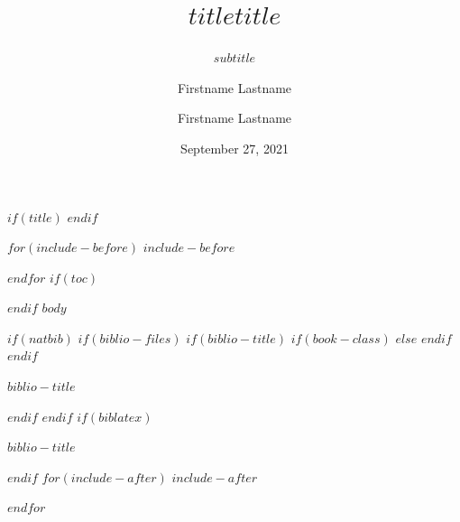 \documentclass[$if(fontsize)$$fontsize$,$endif$$if(handout)$handout,$endif$$if(beamer)$ignorenonframetext,$endif$$for(classoption)$$classoption$$sep$,$endfor$]{$documentclass$}
\title[$shorttitle$]{$title$}
\title{$title$}
\subtitle{$subtitle$}
\institute[$shortinstitute$]{$institute$}
\institute{$institute$}
\author[Firstname Lastname]{Firstname Lastname}
\author{Firstname Lastname}
\date{September 27, 2021}
\begin{document}
$if(title)$
\frame{\titlepage}
$endif$

$for(include-before)$
$include-before$

$endfor$
$if(toc)$
\begin{frame}
\tableofcontents[hideallsubsections]
\end{frame}

$endif$
$body$

$if(natbib)$
$if(biblio-files)$
$if(biblio-title)$
$if(book-class)$
\renewcommand\bibname{$biblio-title$}
$else$
\renewcommand\refname{$biblio-title$}
$endif$
$endif$
\begin{frame}[allowframebreaks]{$biblio-title$}

\end{frame}

$endif$
$endif$
$if(biblatex)$
\begin{frame}[allowframebreaks]{$biblio-title$}
\printbibliography[heading=none]
\end{frame}

$endif$
$for(include-after)$
$include-after$

$endfor$
\end{document}

